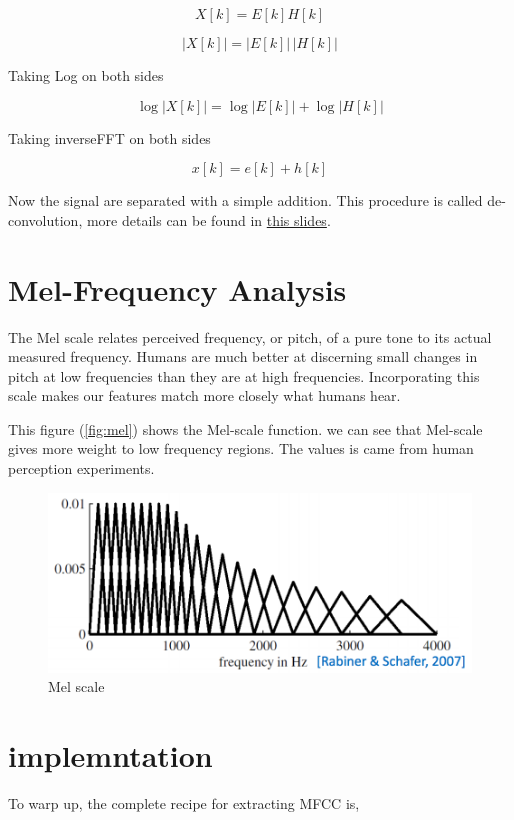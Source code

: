 \documentclass[]{article}
\begin{document}
\[
X[k] = E[k]H[k]
\]

\[
|X[k]|=|E[k]|\,|H[k]|
\]

Taking Log on both sides

\[
\log|X[k]|=\log|E[k]|+\log|H[k]|
\]

Taking inverseFFT on both sides

\[
x[k]=e[k]+h[k]
\]

Now the signal are separated with a simple addition. This procedure is
called de-convolution, more details can be found in
\href{http://www.speech.cs.cmu.edu/11-492/slides/03_mfcc.pdf}{this
slides}.

\section{Mel-Frequency Analysis}\label{mel-frequency-analysis}

The Mel scale relates perceived frequency, or pitch, of a pure tone to
its actual measured frequency. Humans are much better at discerning
small changes in pitch at low frequencies than they are at high
frequencies. Incorporating this scale makes our features match more
closely what humans hear.

This figure (\autoref{fig:mel}) shows the Mel-scale function. we can see
that Mel-scale gives more weight to low frequency regions. The values is
came from human perception experiments.

\begin{figure}[h]\centering\includegraphics[width=\textwidth]{source//images/posts/mel.png}\caption{Mel scale}\label{fig:mel}\end{figure}

\section{implemntation}\label{implemntation}

To warp up, the complete recipe for extracting MFCC is,
\end{document}
